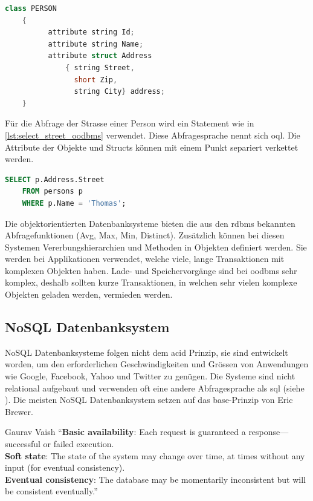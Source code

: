 \begin{lstlisting}[language=C++, caption=Objektdefinition in objektorientierem Datenbanksystem, label=lst:table_definition_oodbms]  
    class PERSON
    {
          attribute string Id;
          attribute string Name;
          attribute struct Address
              { string Street,
                short Zip,
                string City} address;
    }
\end{lstlisting}

Für die Abfrage der Strasse einer Person wird ein Statement wie in \autoref{lst:select_street_oodbms} verwendet. Diese Abfragesprache nennt
sich \gls{oql}. Die Attribute der Objekte und Structs können mit einem Punkt separiert verkettet werden.

\begin{lstlisting}[language=SQL, caption=Abfrage in objektorientierem Datenbanksystem, label=lst:select_street_oodbms]  
    SELECT p.Address.Street
    FROM persons p
    WHERE p.Name = 'Thomas';
\end{lstlisting}

Die objektorientierten Datenbanksysteme bieten die aus den \gls{rdbms} bekannten Abfragefunktionen (Avg, Max, Min, Distinct). 
Zusätzlich können bei diesen Systemen Vererbungshierarchien und Methoden in Objekten definiert werden. Sie werden bei Applikationen verwendet,
welche viele, lange Transaktionen mit komplexen Objekten haben. Lade- und Speichervorgänge sind bei \gls{oodbms} sehr komplex, deshalb 
sollten kurze Transaktionen, in welchen sehr vielen komplexe Objekten geladen werden, vermieden werden.

\subsection{NoSQL Datenbanksystem}\label{no_sql_db}
NoSQL Datenbanksysteme folgen nicht dem \gls{acid} Prinzip, sie sind entwickelt worden, um den erforderlichen Geschwindigkeiten und Grössen von Anwendungen wie Google, 
Facebook, Yahoo und Twitter zu genügen. Die Systeme sind nicht relational aufgebaut und verwenden oft eine andere Abfragesprache als \gls{sql} (siehe \cite{vaish2013getting}). 
Die meisten NoSQL Datenbanksystem setzen auf das \gls{base}-Prinzip von Eric Brewer.

\begin{myQuote}{Gaurav Vaish \cite{vaish2013getting}}
"`\textbf{Basic availability}: Each request is guaranteed a response—successful or failed execution.\\
\textbf{Soft state}: The state of the system may change over time, at times without any input (for eventual consistency).\\
\textbf{Eventual consistency}: The database may be momentarily inconsistent but will be consistent eventually."'
\end{myQuote}

